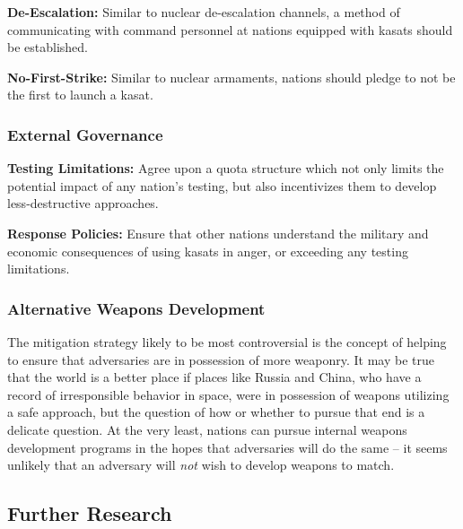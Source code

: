 \textbf{De-Escalation:} Similar to nuclear de-escalation channels, a
method of communicating with command personnel at nations equipped
with \acp{kasat} should be established.

\textbf{No-First-Strike:} Similar to nuclear armaments, nations should
pledge to not be the first to launch a \ac{kasat}.

\subsubsection{External Governance}

\textbf{Testing Limitations:} Agree upon a quota structure which not
only limits the potential impact of any nation's testing, but also
incentivizes them to develop less-destructive approaches.

\textbf{Response Policies:} Ensure that other nations understand the
military and economic consequences of using \acp{kasat} in anger, or
exceeding any testing limitations.

\subsubsection{Alternative Weapons Development}
The mitigation strategy likely to be most controversial is the concept
of helping to ensure that adversaries are in possession of more
weaponry.  It may be true that the world is a better place if places
like Russia and China, who have a record of irresponsible behavior in
space, were in possession of weapons utilizing a \ac{safe} approach,
but the question of how or whether to pursue that end is a delicate
question.  At the very least, nations can pursue internal weapons
development programs in the hopes that adversaries will do the same --
it seems unlikely that an adversary will \emph{not} wish to develop
weapons to match.


\subsection{Further Research}
\label{section::furtherWork}

